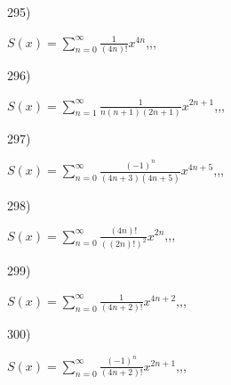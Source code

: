 \documentclass[11pt, ukrainian]{article}
\begin{document}
\par
\vspace{0.9cm}
295) \space 
{%
{$S(x)=\sum\limits_{n=0}^{\infty}{\frac{1}{(4n)!}}{x^{{4n}}}$},,, \par \smallskip  
}
\par
\vspace{0.9cm}
296) \space 
{%
{$S(x)=\sum\limits_{n=1}^{\infty}{\frac{1}{n(n+1)(2n+1)}}{x^{{2n+1}}}$},,, \par \smallskip  
}
\par
\vspace{0.9cm}
297) \space 
{%
{$S(x)=\sum\limits_{n=0}^{\infty}{\frac{(-1)^n}{(4n+3)(4n+5)}}{x^{{4n+5}}}$},,, \par \smallskip  
}
\par
\vspace{0.9cm}
298) \space 
{%
{$S(x)=\sum\limits_{n=0}^{\infty}{\frac{(4n)!}{{((2n)!)^2}}}{x^{{2n}}}$},,, \par \smallskip  
}
\par
\vspace{0.9cm}
299) \space 
{%
{$S(x)=\sum\limits_{n=0}^{\infty}{\frac{1}{(4n+2)!}}{x^{{4n+2}}}$},,, \par \smallskip  
}
\par
\vspace{0.9cm}
300) \space 
{%
{$S(x)=\sum\limits_{n=0}^{\infty}{\frac{(-1)^n}{(4n+2)!}}{x^{{2n+1}}}$},,, \par \smallskip  
}
\par
\newpage
\end{document}
